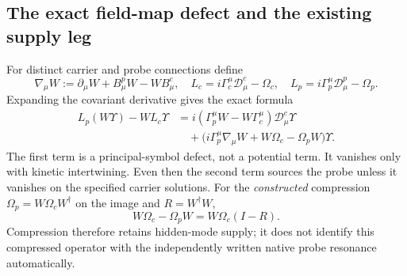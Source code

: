 \documentclass[11pt,a4paper]{article}
\begin{document}
\subsection{The exact field-map defect and the existing supply leg}

For distinct carrier and probe connections define
\[
 \nabla_\mu W:=\partial_\mu W+B^p_\mu W-WB^c_\mu,
 \quad L_c=i\Gamma_c^\mu\mathcal D^c_\mu-\Omega_c,
 \quad L_p=i\Gamma_p^\mu\mathcal D^p_\mu-\Omega_p.
\]
Expanding the covariant derivative gives the exact formula
\begin{align*}
 L_p(W\Upsilon)-WL_c\Upsilon
 &=i(\Gamma_p^\mu W-W\Gamma_c^\mu)
                   \mathcal D^c_\mu\Upsilon\\
 &\quad+
 \bigl(i\Gamma_p^\mu\nabla_\mu W+W\Omega_c-\Omega_pW\bigr)
                   \Upsilon.
\end{align*}
The first term is a principal-symbol defect, not a potential term.
It vanishes only with kinetic intertwining. Even then the second
term sources the probe unless it vanishes on the specified carrier
solutions. For the \emph{constructed} compression
$\Omega_p=W\Omega_cW^\dagger$ on the image and $R=W^\dagger W$,
\[
 W\Omega_c-\Omega_pW=W\Omega_c(I-R).
\]
Compression therefore retains hidden-mode supply; it does not
identify this compressed operator with the independently written
native probe resonance automatically.
\end{document}
